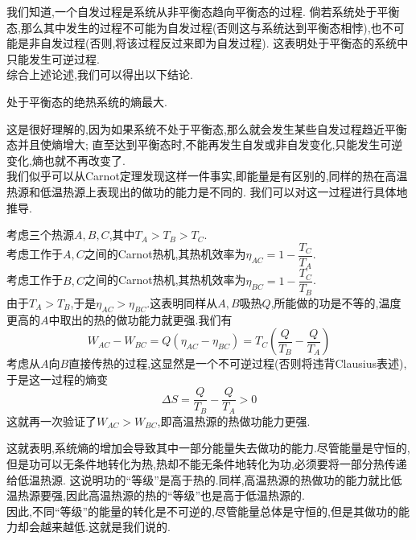 \documentclass{ctexart}
\begin{document}
\indent 我们知道,一个自发过程是系统从非平衡态趋向平衡态的过程.%
倘若系统处于平衡态,那么其中发生的过程不可能为自发过程(否则这与系统达到平衡态相悖),也不可能是非自发过程(否则,将该过程反过来即为自发过程).%
这表明处于平衡态的系统中只能发生可逆过程.\\
\indent 综合上述论述,我们可以得出以下结论.
\begin{theorem}[3A.3.4 绝热系统熵最大的状态]
    处于平衡态的绝热系统的熵最大.
\end{theorem}
这是很好理解的,因为如果系统不处于平衡态,那么就会发生某些自发过程趋近平衡态并且使熵增大;%
直至达到平衡态时,不能再发生自发或非自发变化,只能发生可逆变化,熵也就不再改变了.\vspace{12pt}\\
\indent 我们似乎可以从Carnot定理发现这样一件事实,即能量是有区别的,同样的热在高温热源和低温热源上表现出的做功的能力是不同的.%
我们可以对这一过程进行具体地推导.
\begin{derivation}
    考虑三个热源$A,B,C$,其中$T_A>T_B>T_C$.\\
    考虑工作于$A,C$之间的Carnot热机,其热机效率为$\eta_{AC}=1-\dfrac{T_C}{T_A}$.\\
    考虑工作于$B,C$之间的Carnot热机,其热机效率为$\eta_{BC}=1-\dfrac{T_C}{T_B}$.\\
    由于$T_A>T_B$,于是$\eta_{AC}>\eta_{BC}$.这表明同样从$A,B$吸热$Q$,所能做的功是不等的,温度更高的$A$中取出的热的做功能力就更强.我们有
    \[W_{AC}-W_{BC}=Q\left(\eta_{AC}-\eta_{BC}\right)=T_C\left(\dfrac{Q}{T_B}-\dfrac{Q}{T_A}\right)\]
    考虑从$A$向$B$直接传热的过程,这显然是一个不可逆过程(否则将违背Clausius表述),于是这一过程的熵变
    \[\Delta S=\dfrac{Q}{T_B}-\dfrac{Q}{T_A}>0\]
    这就再一次验证了$W_{AC}>W_{BC}$,即高温热源的热做功能力更强.
\end{derivation}
这就表明,系统熵的增加会导致其中一部分能量失去做功的能力.尽管能量是守恒的,但是功可以无条件地转化为热,热却不能无条件地转化为功,必须要将一部分热传递给低温热源.
这说明功的“等级”是高于热的.同样,高温热源的热做功的能力就比低温热源要强,因此高温热源的热的“等级”也是高于低温热源的.\\
\indent 因此,不同“等级”的能量的转化是不可逆的,尽管能量总体是守恒的,但是其做功的能力却会越来越低.这就是我们说的.
\end{document}
